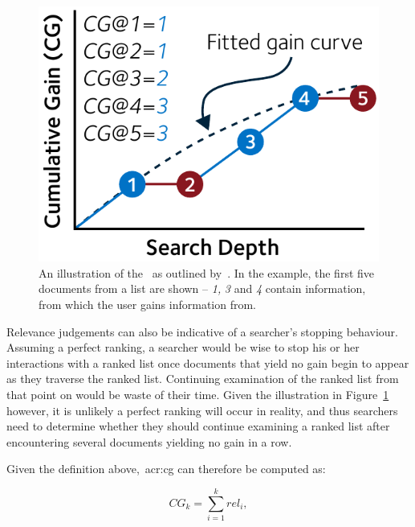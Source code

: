 \begin{figure}
    \begin{center}
    \vspace*{-10mm}
    \includegraphics[width=1\textwidth]{figures/ch2-cg.pdf}
    \end{center}
    \vspace*{-4mm}
    \caption[Cumulative Gain]{An illustration of the~ as outlined by~\cite{jarvelin2000cg, jarvelin2002cg}. In the example, the first five documents from a list are shown – \emph{1,} \emph{3} and \emph{4} contain information, from which the user gains information from.}
    \label{fig:cg}
\end{figure}

Relevance judgements can also be indicative of a searcher's stopping behaviour. Assuming a perfect ranking, a searcher would be wise to stop his or her interactions with a ranked list once documents that yield no gain begin to appear as they traverse the ranked list. Continuing examination of the ranked list from that point on would be waste of their time. Given the illustration in Figure~\ref{fig:cg} however, it is unlikely a perfect ranking will occur in reality, and thus searchers need to determine whether they should continue examining a ranked list after encountering several documents yielding no gain in a row.

Given the definition above,~\gls{acr:cg} can therefore be computed as:

\begin{equation*}
    CG_k = \sum_{i=1}^{k} rel_i,
\end{equation*}

